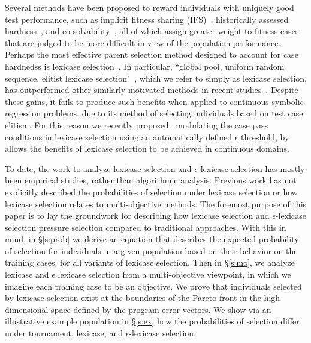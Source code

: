 \documentclass[twoside]{article}
\begin{document}
Several methods have been proposed to reward individuals with uniquely good test performance, such as implicit fitness sharing (IFS)~\citep{mckay_investigation_2001}, historically assessed hardness~\citep{klein_genetic_2008}, and co-solvability~\citep{schaefer_using_2010}, all of which assign greater weight to fitness cases that are judged to be more difficult in view of the population performance. Perhaps the most effective parent selection method designed to account for case hardnedss is lexicase selection~\citep{helmuth_solving_2014,spector_assessment_2012}. In particular, ``global  pool,  uniform  random  sequence,  elitist  lexicase  selection"~\citep{spector_assessment_2012}, which we refer to simply as lexicase selection, has outperformed other similarly-motivated methods in recent studies~\citep{helmuth_general_2015-1,liskowski_comparison_2015}. Despite these gains, it fails to produce such benefits when applied to continuous symbolic regression problems, due to its method of selecting individuals based on test case elitism. For this reason we recently proposed~\citep{la_cava_epsilon-lexicase_2016} modulating the case pass conditions in lexicase selection using an automatically defined $\epsilon$ threshold, by allows the benefits of lexicase selection to be achieved in continuous domains. 

To date, the work to analyze lexicase selection and $\epsilon$-lexicase selection has mostly been empirical studies, rather than algorithmic analysis. Previous work has not explicitly described the probabilities of selection under lexicase selection or how lexicase selection relates to multi-objective methods. The foremost purpose of this paper is to lay the groundwork for describing how lexicase selection and $\epsilon$-lexicase selection pressure selection compared to traditional approaches. With this in mind, in \S\ref{s:prob} we derive an equation that describes the expected probability of selection for individuals in a given population based on their behavior on the training cases, for all variants of lexicase selection. Then in \S\ref{s:mo}, we analyze lexicase and $\epsilon$ lexicase selection from a multi-objective viewpoint, in which we imagine each training case to be an objective. We prove that individuals selected by lexicase selection exist at the boundaries of the Pareto front in the high-dimensional space defined by the program error vectors. We show via an illustrative example population in \S\ref{s:ex} how the probabilities of selection differ under tournament, lexicase, and $\epsilon$-lexicase selection. 
\end{document}

